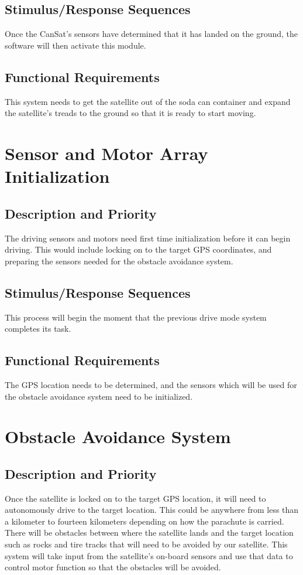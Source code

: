\documentclass{scrreprt}
\begin{document}
\subsection{Stimulus/Response Sequences}
Once the CanSat's sensors have determined that it has landed on the ground, the software will then activate this module.

\subsection{Functional Requirements}
This system needs to get the satellite out of the soda can container and expand the satellite's treads to the ground so that it is ready to start moving.

\section{Sensor and Motor Array Initialization}

\subsection{Description and Priority}
The driving sensors and motors need first time initialization before it can begin driving. This would include locking on to the target GPS coordinates, and preparing the sensors needed for the obstacle avoidance system.


\subsection{Stimulus/Response Sequences}
This process will begin the moment that the previous drive mode system completes its task. 

\subsection{Functional Requirements}
The GPS location needs to be determined, and the sensors which will be used for the obstacle avoidance system need to be initialized. 

\section{Obstacle Avoidance System}

\subsection{Description and Priority}
Once the satellite is locked on to the target GPS location, it will need to autonomously drive to the target location. This could be anywhere from less than a kilometer to fourteen kilometers depending on how the parachute is carried. There will be obstacles between where the satellite lands and the target location such as rocks and tire tracks that will need to be avoided by our satellite. This system will take input from the satellite's on-board sensors and use that data to control motor function so that the obstacles will be avoided.
\end{document}
